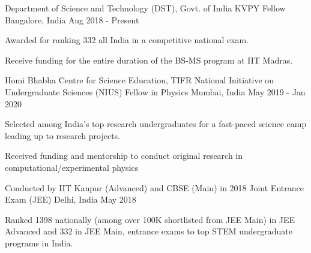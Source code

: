 

\begin{cventries}
  
  \cventry
    {Department of Science and Technology (DST), Govt. of India} %
    {KVPY Fellow} %
    {Bangalore, India} %
    {Aug 2018 - Present} %
    {
      \begin{cvitems} %
        \item {Awarded for ranking 332 all India in a competitive national exam.}
        \item {Receive funding for the entire duration of the BS-MS program at IIT Madras.}
      \end{cvitems}
    }



  \cventry
    {Homi Bhabha Centre for Science Education, TIFR} %
    {National Initiative on Undergraduate Sciences (NIUS) Fellow in Physics} %
    {Mumbai, India} %
    {May 2019 - Jan 2020} %
    {
      \begin{cvitems} %
        \item {Selected among India's top research undergraduates for a fast-paced science camp leading up to research projects.}
        \item {Received funding and mentorship to conduct original research in computational/experimental physics}
      \end{cvitems}
    }



  \cventry
    {Conducted by IIT Kanpur (Advanced) and CBSE (Main) in 2018} %
    {Joint Entrance Exam (JEE)} %
    {Delhi, India} %
    {May 2018} %
    {
      \begin{cvitems} %
        \item {Ranked 1398 nationally (among over 100K shortlisted from JEE Main) in JEE Advanced and 332 in JEE Main, entrance exams to top STEM undergraduate programs in India.}
      \end{cvitems}
    }


\end{cventries}
